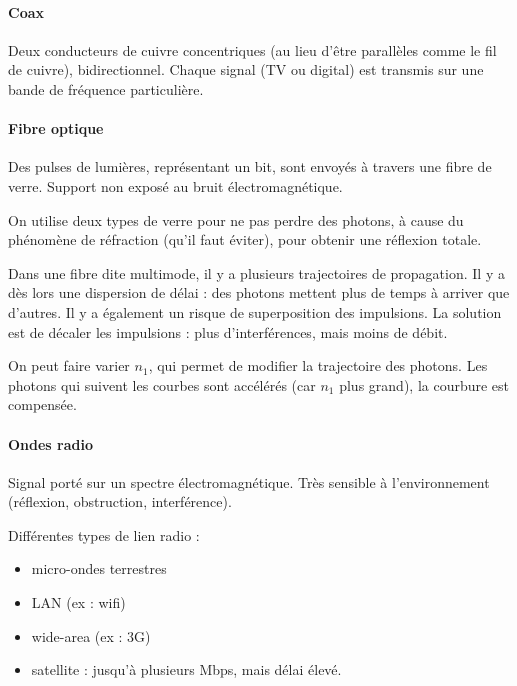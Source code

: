 	\paragraph{Coax}
	
	Deux conducteurs de cuivre concentriques (au lieu d'être parallèles comme le fil de cuivre), bidirectionnel. Chaque signal (TV ou digital) est transmis sur une bande de fréquence particulière.
	
	\paragraph{Fibre optique}
	
	Des pulses de lumières, représentant un bit, sont envoyés à travers une fibre de verre. Support non exposé au bruit électromagnétique.
	
	On utilise deux types de verre pour ne pas perdre des photons, à cause du phénomène de réfraction (qu'il faut éviter), pour obtenir une réflexion totale.
	
	Dans une fibre dite multimode, il y a plusieurs trajectoires de propagation. Il y a dès lors une dispersion de délai : des photons mettent plus de temps à arriver que d'autres. Il y a également un risque de superposition des impulsions. La solution est de décaler les impulsions : plus d'interférences, mais moins de débit. 
	

	On peut faire varier $n_1$, qui permet de modifier la trajectoire des photons. Les photons qui suivent les courbes sont accélérés (car $n_1$ plus grand), la courbure est compensée.
	
	
	\paragraph{Ondes radio}
	
	Signal porté sur un spectre électromagnétique. Très sensible à l'environnement (réflexion, obstruction, interférence).
	
	Différentes types de lien radio :
	
	\begin{itemize}
		\item micro-ondes terrestres
		\item LAN (ex : wifi)
		\item wide-area (ex : 3G)
		\item satellite : jusqu'à plusieurs Mbps, mais délai élevé.
	\end{itemize}
	
